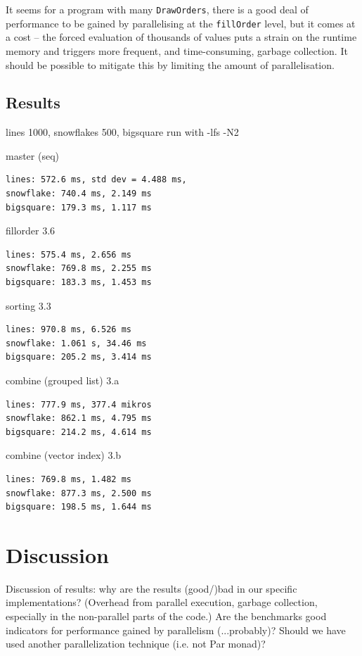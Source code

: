 \documentclass[12pt, a4paper]{article}
\begin{document}
It seems for a program with many \texttt{DrawOrders}, there is a good deal of performance to be gained by parallelising at the \texttt{fillOrder} level, but it comes at a cost -- the forced evaluation of thousands of values puts a strain on the runtime memory and triggers more frequent, and time-consuming, garbage collection. It should be possible to mitigate this by limiting the amount of parallelisation.


\subsection{Results}

lines 1000, snowflakes 500, bigsquare
run with -lfs -N2

master (seq)
\begin{verbatim}
lines: 572.6 ms, std dev = 4.488 ms, 
snowflake: 740.4 ms, 2.149 ms
bigsquare: 179.3 ms, 1.117 ms
\end{verbatim}

fillorder 3.6
\begin{verbatim}
lines: 575.4 ms, 2.656 ms
snowflake: 769.8 ms, 2.255 ms
bigsquare: 183.3 ms, 1.453 ms
\end{verbatim}

sorting 3.3
\begin{verbatim}
lines: 970.8 ms, 6.526 ms
snowflake: 1.061 s, 34.46 ms
bigsquare: 205.2 ms, 3.414 ms
\end{verbatim}

combine (grouped list) 3.a
\begin{verbatim}
lines: 777.9 ms, 377.4 mikros
snowflake: 862.1 ms, 4.795 ms
bigsquare: 214.2 ms, 4.614 ms
\end{verbatim}

combine (vector index) 3.b
\begin{verbatim}
lines: 769.8 ms, 1.482 ms
snowflake: 877.3 ms, 2.500 ms
bigsquare: 198.5 ms, 1.644 ms
\end{verbatim}

\section{Discussion}\label{discussion}

Discussion of results: why are the results (good/)bad in our specific implementations? (Overhead from parallel execution, garbage collection, especially in the non-parallel parts of the code.)
Are the benchmarks good indicators for performance gained by parallelism (...probably)? Should we have used another parallelization technique (i.e. not Par monad)?
\end{document}
